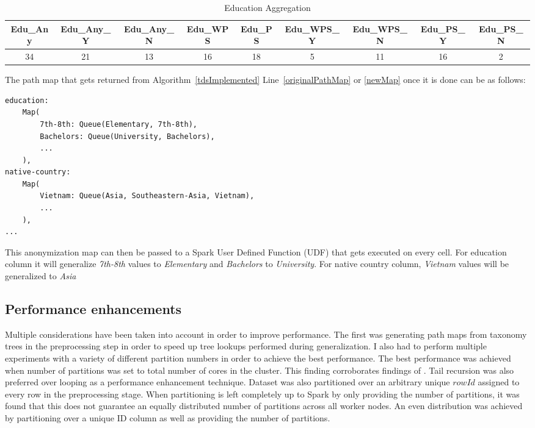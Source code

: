 \documentclass[11pt]{article}       %
\begin{document}
\begin{table}[htp]
\begin{adjustbox}{width=\textwidth, center}
\begin{tabular}{|c|c|c|c|c|c|c|c|c|}
\hline
Edu\_Any & Edu\_Any\_Y & Edu\_Any\_N & Edu\_WPS & Edu\_PS & Edu\_WPS\_Y & Edu\_WPS\_N & Edu\_PS\_Y & Edu\_PS\_N\\
\hline
34 & 21 & 13 & 16 & 18 & 5 & 11 & 16 & 2\\
\hline
\end{tabular}
\end{adjustbox}
\caption{Education Aggregation}
\label{table4}
\end{table}

The path map that gets returned from Algorithm~\ref{tdsImplemented} Line~\ref{originalPathMap} or \ref{newMap} once it is done can be as follows:

\begin{verbatim}
education:
    Map(
        7th-8th: Queue(Elementary, 7th-8th),
        Bachelors: Queue(University, Bachelors),
        ...
    ),
native-country:
    Map(
        Vietnam: Queue(Asia, Southeastern-Asia, Vietnam),
        ...
    ),
...
\end{verbatim}

This anonymization map can then be passed to a Spark User Defined Function (UDF) that gets executed on every cell. For education column it will generalize \emph{7th-8th} values to \emph{Elementary} and \emph{Bachelors} to \emph{University}. For native country column, \emph{Vietnam} values will be generalized to \emph{Asia}

\subsection{Performance enhancements}

Multiple considerations have been taken into account in order to improve performance. The first was generating path maps from taxonomy trees in the preprocessing step in order to speed up tree lookups performed during generalization. I also had to perform multiple experiments with a variety of different partition numbers in order to achieve the best performance. The best performance was achieved when number of partitions was set to total number of cores in the cluster. This finding corroborates findings of \cite{Sopaoglu:2017}. Tail recursion was also preferred over looping as a performance enhancement technique. Dataset was also partitioned over an arbitrary unique $rowId$ assigned to every row in the preprocessing stage. When partitioning is left completely up to Spark by only providing the number of partitions, it was found that this does not guarantee an equally distributed number of partitions across all worker nodes. An even distribution was achieved by partitioning over a unique ID column as well as providing the number of partitions.
\end{document}
